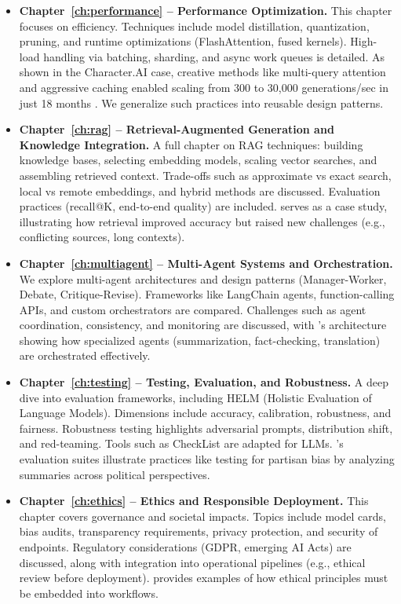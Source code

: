 \begin{itemize}
    \item \textbf{Chapter~\ref{ch:performance} -- Performance Optimization.}  
    This chapter focuses on efficiency. Techniques include model distillation, quantization, pruning, and runtime optimizations (FlashAttention, fused kernels). High-load handling via batching, sharding, and async work queues is detailed. As shown in the Character.AI case, creative methods like multi-query attention and aggressive caching enabled scaling from 300 to 30,000 generations/sec in just 18 months \parencite{zenml2023}. We generalize such practices into reusable design patterns.

    \item \textbf{Chapter~\ref{ch:rag} -- Retrieval-Augmented Generation and Knowledge Integration.}  
    A full chapter on RAG techniques: building knowledge bases, selecting embedding models, scaling vector searches, and assembling retrieved context. Trade-offs such as approximate vs exact search, local vs remote embeddings, and hybrid methods are discussed. Evaluation practices (recall@K, end-to-end quality) are included. \ishtar{} serves as a case study, illustrating how retrieval improved accuracy but raised new challenges (e.g., conflicting sources, long contexts).

    \item \textbf{Chapter~\ref{ch:multiagent} -- Multi-Agent Systems and Orchestration.}  
    We explore multi-agent architectures and design patterns (Manager-Worker, Debate, Critique-Revise). Frameworks like LangChain agents, function-calling APIs, and custom orchestrators are compared. Challenges such as agent coordination, consistency, and monitoring are discussed, with \ishtar{}'s architecture showing how specialized agents (summarization, fact-checking, translation) are orchestrated effectively.

    \item \textbf{Chapter~\ref{ch:testing} -- Testing, Evaluation, and Robustness.}  
    A deep dive into evaluation frameworks, including HELM (Holistic Evaluation of Language Models). Dimensions include accuracy, calibration, robustness, and fairness. Robustness testing highlights adversarial prompts, distribution shift, and red-teaming. Tools such as CheckList are adapted for LLMs. \ishtar{}'s evaluation suites illustrate practices like testing for partisan bias by analyzing summaries across political perspectives.

    \item \textbf{Chapter~\ref{ch:ethics} -- Ethics and Responsible Deployment.}  
    This chapter covers governance and societal impacts. Topics include model cards, bias audits, transparency requirements, privacy protection, and security of endpoints. Regulatory considerations (GDPR, emerging AI Acts) are discussed, along with integration into operational pipelines (e.g., ethical review before deployment). \ishtar{} provides examples of how ethical principles must be embedded into workflows.


\end{itemize}
